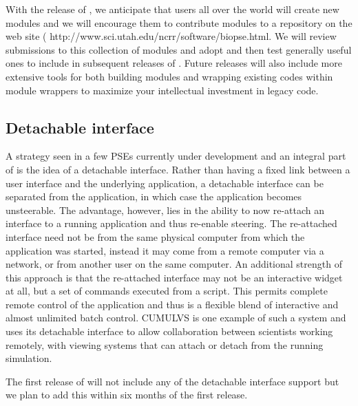 With the release of \SR{}, we anticipate that users all over the world will
create new modules and we will encourage them to contribute modules to a
repository on the \PSE{} web site 
(
{http://www.sci.utah.edu/ncrr/software/biopse.html}.  We will review
submissions to this collection of modules and adopt and then test generally
useful ones to include in subsequent releases of \PSE{}.  Future releases
will also include more extensive tools for both building modules and
wrapping existing codes within \SR{} module wrappers to maximize your
intellectual investment in legacy code.


\subsection{Detachable interface}
\label{sec:con-detach} 

A strategy seen in a few PSEs currently under development and an integral
part of \SR{} is the idea of a detachable interface.  Rather than having a
fixed link between a user interface and the underlying application, a
detachable interface can be separated from the application, in which case
the application becomes unsteerable.  The advantage, however, lies in the
ability to now re-attach an interface to a running application and thus
re-enable steering.  The re-attached interface need not be from the same
physical computer from which the application was started, instead it may
come from a remote computer via a network, or from another user on the same
computer.  An additional strength of this approach is that the re-attached
interface may not be an interactive widget at all, but a set of commands
executed from a script.  This permits complete remote control of the
application and thus is a flexible blend of interactive and almost
unlimited batch control.  CUMULVS  is one example of such a
system and uses its detachable interface to allow collaboration between
scientists working remotely, with viewing systems that can attach or detach
from the running simulation.

The first release of \SR{} will not include any of the detachable interface
support but we plan to add this within six months of the first release.

